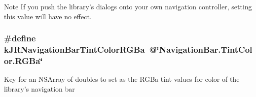 \begin{DoxyNote}{Note}
If you push the library's dialogs onto your own navigation controller, setting this value will have no effect. 
\end{DoxyNote}
\hypertarget{group__custom_interface_gabda4f66c5cde44bbeaa6a993f4793ac5}{
\subsubsection[{kJRNavigationBarTintColorRGBa}]{\setlength{\rightskip}{0pt plus 5cm}\#define kJRNavigationBarTintColorRGBa~@\char`\"{}NavigationBar.TintColor.RGBa\char`\"{}}}
\label{group__custom_interface_gabda4f66c5cde44bbeaa6a993f4793ac5}
Key for an {\ttfamily NSArray} of doubles to set as the RGBa tint values for color of the library's navigation bar

